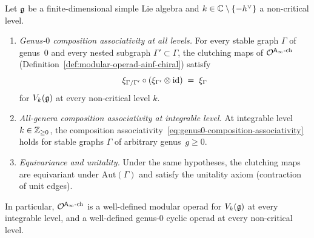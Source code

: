 \begin{theorem}
\label{thm:affine-composition-associativity}
Let $\mathfrak{g}$ be a finite-dimensional simple Lie algebra and
$k \in \mathbb{C} \setminus \{-h^\vee\}$ a non-critical level.
\begin{enumerate}[label=\textup{(\alph*)}]
\item \emph{Genus-$0$ composition associativity at all levels.}
 For every stable graph $\Gamma$ of genus~$0$ and every
 nested subgraph $\Gamma' \subset \Gamma$, the clutching maps
 of $\mathcal{O}^{\mathsf{A}_{\infty}\textup{-ch}}$
 \textup{(}Definition~\textup{\ref{def:modular-operad-ainf-chiral}}\textup{)}
 satisfy
 \begin{equation}\label{eq:genus0-composition-associativity}
 \xi_{\Gamma/\Gamma'} \circ (\xi_{\Gamma'} \otimes \mathrm{id})
 \;=\; \xi_\Gamma
 \end{equation}
 for $V_k(\mathfrak{g})$ at every non-critical level $k$.

\item \emph{All-genera composition associativity at integrable level.}
 At integrable level $k \in \mathbb{Z}_{\ge 0}$, the composition
 associativity~\eqref{eq:genus0-composition-associativity}
 holds for stable graphs $\Gamma$ of
 arbitrary genus~$g \ge 0$.

\item \emph{Equivariance and unitality.}
 Under the same hypotheses, the clutching maps are
 equivariant under $\mathrm{Aut}(\Gamma)$ and satisfy the
 unitality axiom \textup{(}contraction of unit edges\textup{)}.
\end{enumerate}
In particular, $\mathcal{O}^{\mathsf{A}_{\infty}\textup{-ch}}$ is a
well-defined modular operad for $V_k(\mathfrak{g})$ at every integrable
level, and a well-defined genus-$0$ cyclic operad at every
non-critical level.
\end{theorem}

